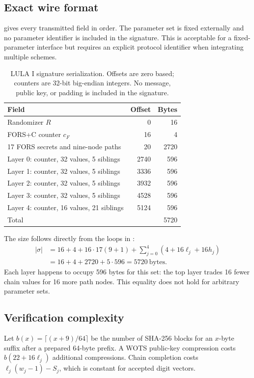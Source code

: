 \documentclass[a4paper,envcountsame,runningheads]{llncs}
\begin{document}
\subsection{Exact wire format}
 gives every transmitted field in order. The parameter set is fixed externally and no parameter identifier is included in the signature. This is acceptable for a fixed-parameter interface but requires an explicit protocol identifier when integrating multiple schemes.

\begin{table}[t]
\caption{LULA I signature serialization. Offsets are zero based; counters are 32-bit big-endian integers. No message, public key, or padding is included in the signature.}\label{tab:wire}
\centering\small
\begin{tabular}{P{49mm}rr}\toprule
Field & Offset & Bytes\\\midrule
Randomizer $R$ &0&16\\
FORS+C counter $c_F$ &16&4\\
17 FORS secrets and nine-node paths &20&2720\\
Layer 0: counter, 32 values, 5 siblings &2740&596\\
Layer 1: counter, 32 values, 5 siblings &3336&596\\
Layer 2: counter, 32 values, 5 siblings &3932&596\\
Layer 3: counter, 32 values, 5 siblings &4528&596\\
Layer 4: counter, 16 values, 21 siblings &5124&596\\\midrule
Total &&5720\\\bottomrule
\end{tabular}
\end{table}

The size follows directly from the loops in :
\begin{align}\label{eq:size}
 |\sigma|&=16+4+16\cdot17(9+1)
      +\sum_{j=0}^{4}(4+16\ell_j+16h_j)\nonumber\\
 &=16+4+2720+5\cdot596=5720\ \mathrm{bytes}.
\end{align}
Each layer happens to occupy 596 bytes for this set: the top layer trades 16 fewer chain values for 16 more path nodes. This equality does not hold for arbitrary parameter sets.

\subsection{Verification complexity}
Let $b(x)=\lceil(x+9)/64\rceil$ be the number of SHA-256 blocks for an $x$-byte suffix after a prepared 64-byte prefix. A WOTS public-key compression costs $b(22+16\ell_j)$ additional compressions. Chain completion costs $\ell_j(w_j-1)-S_j$, which is constant for accepted digit vectors.
\end{document}
